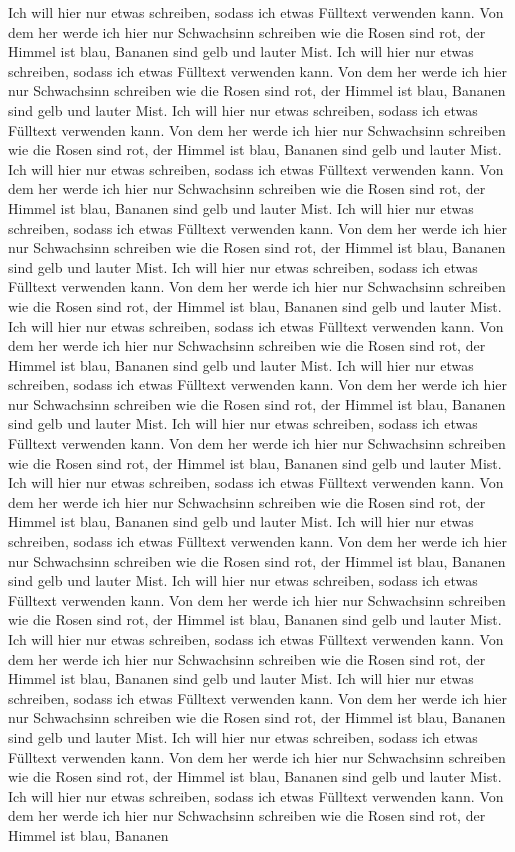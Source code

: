 Ich will hier nur etwas schreiben, sodass ich etwas Fülltext verwenden kann. Von dem her werde ich hier nur Schwachsinn schreiben wie die Rosen sind rot, der Himmel ist blau, Bananen sind gelb und lauter Mist. Ich will hier nur etwas schreiben, sodass ich etwas Fülltext verwenden kann. Von dem her werde ich hier nur Schwachsinn schreiben wie die Rosen sind rot, der Himmel ist blau, Bananen sind gelb und lauter Mist. Ich will hier nur etwas schreiben, sodass ich etwas Fülltext verwenden kann. Von dem her werde ich hier nur Schwachsinn schreiben wie die Rosen sind rot, der Himmel ist blau, Bananen sind gelb und lauter Mist. Ich will hier nur etwas schreiben, sodass ich etwas Fülltext verwenden kann. Von dem her werde ich hier nur Schwachsinn schreiben wie die Rosen sind rot, der Himmel ist blau, Bananen sind gelb und lauter Mist. Ich will hier nur etwas schreiben, sodass ich etwas Fülltext verwenden kann. Von dem her werde ich hier nur Schwachsinn schreiben wie die Rosen sind rot, der Himmel ist blau, Bananen sind gelb und lauter Mist. Ich will hier nur etwas schreiben, sodass ich etwas Fülltext verwenden kann. Von dem her werde ich hier nur Schwachsinn schreiben wie die Rosen sind rot, der Himmel ist blau, Bananen sind gelb und lauter Mist. Ich will hier nur etwas schreiben, sodass ich etwas Fülltext verwenden kann. Von dem her werde ich hier nur Schwachsinn schreiben wie die Rosen sind rot, der Himmel ist blau, Bananen sind gelb und lauter Mist. Ich will hier nur etwas schreiben, sodass ich etwas Fülltext verwenden kann. Von dem her werde ich hier nur Schwachsinn schreiben wie die Rosen sind rot, der Himmel ist blau, Bananen sind gelb und lauter Mist. Ich will hier nur etwas schreiben, sodass ich etwas Fülltext verwenden kann. Von dem her werde ich hier nur Schwachsinn schreiben wie die Rosen sind rot, der Himmel ist blau, Bananen sind gelb und lauter Mist. Ich will hier nur etwas schreiben, sodass ich etwas Fülltext verwenden kann. Von dem her werde ich hier nur Schwachsinn schreiben wie die Rosen sind rot, der Himmel ist blau, Bananen sind gelb und lauter Mist. Ich will hier nur etwas schreiben, sodass ich etwas Fülltext verwenden kann. Von dem her werde ich hier nur Schwachsinn schreiben wie die Rosen sind rot, der Himmel ist blau, Bananen sind gelb und lauter Mist. Ich will hier nur etwas schreiben, sodass ich etwas Fülltext verwenden kann. Von dem her werde ich hier nur Schwachsinn schreiben wie die Rosen sind rot, der Himmel ist blau, Bananen sind gelb und lauter Mist. Ich will hier nur etwas schreiben, sodass ich etwas Fülltext verwenden kann. Von dem her werde ich hier nur Schwachsinn schreiben wie die Rosen sind rot, der Himmel ist blau, Bananen sind gelb und lauter Mist. Ich will hier nur etwas schreiben, sodass ich etwas Fülltext verwenden kann. Von dem her werde ich hier nur Schwachsinn schreiben wie die Rosen sind rot, der Himmel ist blau, Bananen sind gelb und lauter Mist. Ich will hier nur etwas schreiben, sodass ich etwas Fülltext verwenden kann. Von dem her werde ich hier nur Schwachsinn schreiben wie die Rosen sind rot, der Himmel ist blau, Bananen sind gelb und lauter Mist. Ich will hier nur etwas schreiben, sodass ich etwas Fülltext verwenden kann. Von dem her werde ich hier nur Schwachsinn schreiben wie die Rosen sind rot, der Himmel ist blau, Bananen 